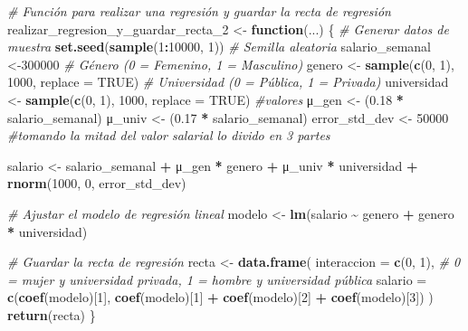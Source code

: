 \documentclass[
]{article}
\newenvironment{Shaded}{\begin{snugshade}}{\end{snugshade}}
\newcommand{\AttributeTok}[1]{\textcolor[rgb]{0.13,0.29,0.53}{#1}}
\newcommand{\CommentTok}[1]{\textcolor[rgb]{0.56,0.35,0.01}{\textit{#1}}}
\newcommand{\ConstantTok}[1]{\textcolor[rgb]{0.56,0.35,0.01}{#1}}
\newcommand{\ControlFlowTok}[1]{\textcolor[rgb]{0.13,0.29,0.53}{\textbf{#1}}}
\newcommand{\DecValTok}[1]{\textcolor[rgb]{0.00,0.00,0.81}{#1}}
\newcommand{\FloatTok}[1]{\textcolor[rgb]{0.00,0.00,0.81}{#1}}
\newcommand{\FunctionTok}[1]{\textcolor[rgb]{0.13,0.29,0.53}{\textbf{#1}}}
\newcommand{\NormalTok}[1]{#1}
\newcommand{\OtherTok}[1]{\textcolor[rgb]{0.56,0.35,0.01}{#1}}
\newcommand{\SpecialCharTok}[1]{\textcolor[rgb]{0.81,0.36,0.00}{\textbf{#1}}}
\begin{document}
\begin{Shaded}
\begin{Highlighting}[]
\CommentTok{\# Función para realizar una regresión y guardar la recta de regresión}
\NormalTok{realizar\_regresion\_y\_guardar\_recta\_2 }\OtherTok{\textless{}{-}} \ControlFlowTok{function}\NormalTok{(...) \{}
  \CommentTok{\# Generar datos de muestra}
  \FunctionTok{set.seed}\NormalTok{(}\FunctionTok{sample}\NormalTok{(}\DecValTok{1}\SpecialCharTok{:}\DecValTok{10000}\NormalTok{, }\DecValTok{1}\NormalTok{))  }\CommentTok{\# Semilla aleatoria}
\NormalTok{  salario\_semanal }\OtherTok{\textless{}{-}}\DecValTok{300000} 
  \CommentTok{\# Género (0 = Femenino, 1 = Masculino)}
\NormalTok{  genero }\OtherTok{\textless{}{-}} \FunctionTok{sample}\NormalTok{(}\FunctionTok{c}\NormalTok{(}\DecValTok{0}\NormalTok{, }\DecValTok{1}\NormalTok{), }\DecValTok{1000}\NormalTok{, }\AttributeTok{replace =} \ConstantTok{TRUE}\NormalTok{)}
  \CommentTok{\# Universidad (0 = Pública, 1 =  Privada)}
\NormalTok{  universidad }\OtherTok{\textless{}{-}} \FunctionTok{sample}\NormalTok{(}\FunctionTok{c}\NormalTok{(}\DecValTok{0}\NormalTok{, }\DecValTok{1}\NormalTok{), }\DecValTok{1000}\NormalTok{, }\AttributeTok{replace =} \ConstantTok{TRUE}\NormalTok{)}
  \CommentTok{\#valores}
\NormalTok{  μ\_gen }\OtherTok{\textless{}{-}}\NormalTok{ (}\FloatTok{0.18} \SpecialCharTok{*}\NormalTok{ salario\_semanal)}
\NormalTok{  μ\_univ }\OtherTok{\textless{}{-}}\NormalTok{ (}\FloatTok{0.17} \SpecialCharTok{*}\NormalTok{ salario\_semanal)}
\NormalTok{  error\_std\_dev }\OtherTok{\textless{}{-}} \DecValTok{50000} \CommentTok{\#tomando la mitad del valor salarial lo divido en 3 partes}

\NormalTok{  salario }\OtherTok{\textless{}{-}}\NormalTok{ salario\_semanal }\SpecialCharTok{+}\NormalTok{ μ\_gen }\SpecialCharTok{*}\NormalTok{ genero }\SpecialCharTok{+}\NormalTok{ μ\_univ }\SpecialCharTok{*}\NormalTok{ universidad }\SpecialCharTok{+} \FunctionTok{rnorm}\NormalTok{(}\DecValTok{1000}\NormalTok{, }\DecValTok{0}\NormalTok{, error\_std\_dev)}
    
  \CommentTok{\# Ajustar el modelo de regresión lineal}
\NormalTok{  modelo }\OtherTok{\textless{}{-}} \FunctionTok{lm}\NormalTok{(salario }\SpecialCharTok{\textasciitilde{}}\NormalTok{ genero }\SpecialCharTok{+}\NormalTok{ genero }\SpecialCharTok{*}\NormalTok{ universidad)}

 \CommentTok{\# Guardar la recta de regresión}
\NormalTok{  recta }\OtherTok{\textless{}{-}} \FunctionTok{data.frame}\NormalTok{(}
    \AttributeTok{interaccion =} \FunctionTok{c}\NormalTok{(}\DecValTok{0}\NormalTok{, }\DecValTok{1}\NormalTok{), }\CommentTok{\# 0 = mujer y universidad privada, 1 = hombre y universidad pública}
    \AttributeTok{salario =} \FunctionTok{c}\NormalTok{(}\FunctionTok{coef}\NormalTok{(modelo)[}\DecValTok{1}\NormalTok{], }\FunctionTok{coef}\NormalTok{(modelo)[}\DecValTok{1}\NormalTok{] }\SpecialCharTok{+} \FunctionTok{coef}\NormalTok{(modelo)[}\DecValTok{2}\NormalTok{] }\SpecialCharTok{+} \FunctionTok{coef}\NormalTok{(modelo)[}\DecValTok{3}\NormalTok{])}
\NormalTok{  )}
  \FunctionTok{return}\NormalTok{(recta)}
\NormalTok{\}}


\end{Highlighting}
\end{Shaded}
\end{document}
